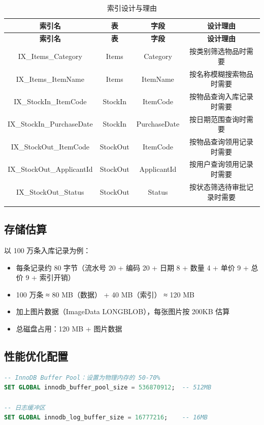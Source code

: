 \documentclass[12pt,a4paper]{ctexart}
\begin{document}
\begin{longtable}{c|c|c|c}
\toprule
\textbf{索引名} & \textbf{表} & \textbf{字段} & \textbf{设计理由} \\
\midrule
\endfirsthead
\toprule
\textbf{索引名} & \textbf{表} & \textbf{字段} & \textbf{设计理由} \\
\midrule
\endhead
IX\_Items\_Category & Items & Category & 按类别筛选物品时需要 \\
IX\_Items\_ItemName & Items & ItemName & 按名称模糊搜索物品时需要 \\
IX\_StockIn\_ItemCode & StockIn & ItemCode & 按物品查询入库记录时需要 \\
IX\_StockIn\_PurchaseDate & StockIn & PurchaseDate & 按日期范围查询时需要 \\
IX\_StockOut\_ItemCode & StockOut & ItemCode & 按物品查询领用记录时需要 \\
IX\_StockOut\_ApplicantId & StockOut & ApplicantId & 按用户查询领用记录时需要 \\
IX\_StockOut\_Status & StockOut & Status & 按状态筛选待审批记录时需要 \\
\bottomrule
\caption{索引设计与理由}
\end{longtable}

\subsection{存储估算}

以 100 万条入库记录为例：

\begin{itemize}
    \item 每条记录约 80 字节（流水号 20 + 编码 20 + 日期 8 + 数量 4 + 单价 9 + 总价 9 + 索引开销）
    \item 100 万条 ≈ 80 MB（数据） + 40 MB（索引） ≈ 120 MB
    \item 加上图片数据（ImageData LONGBLOB），每张图片按 200KB 估算
    \item 总磁盘占用：120 MB + 图片数据
\end{itemize}

\subsection{性能优化配置}

\begin{lstlisting}[language=SQL,caption=MySQL 配置建议]
-- InnoDB Buffer Pool：设置为物理内存的 50-70%
SET GLOBAL innodb_buffer_pool_size = 536870912;  -- 512MB

-- 日志缓冲区
SET GLOBAL innodb_log_buffer_size = 16777216;    -- 16MB
\end{lstlisting}
\end{document}
